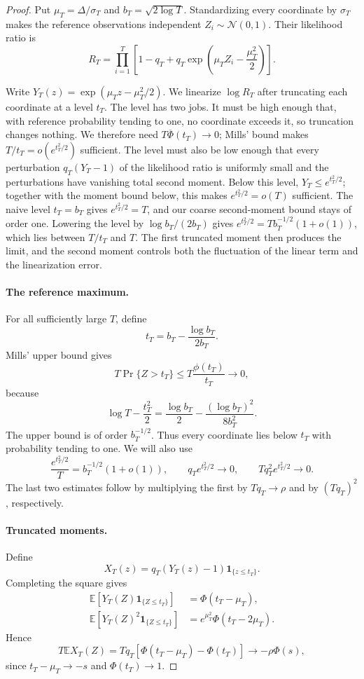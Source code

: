 \documentclass[11pt]{article}
\theoremstyle{remark}
\newcommand{\E}{\mathbb E}
\newcommand{\Normal}{\mathcal N}
\begin{document}
\begin{proof}
Put $\mu_T=\Delta/\sigma_T$ and $b_T=\sqrt{2\log T}$. Standardizing every
coordinate by $\sigma_T$ makes the reference observations independent
$Z_i\sim\Normal(0,1)$. Their likelihood ratio is
\begin{equation}\label{eq:sparse-likelihood-ratio}
 R_T=\prod_{i=1}^T
 \left[1-q_T+q_T\exp\left(\mu_TZ_i-\frac{\mu_T^2}{2}\right)\right].
\end{equation}

Write $Y_T(z)=\exp(\mu_Tz-\mu_T^2/2)$. We linearize $\log R_T$ after
truncating each coordinate at a level $t_T$.
The level has two jobs. It must be high enough that, with reference
probability tending to one, no coordinate exceeds it, so truncation changes
nothing. We therefore need $T\overline\Phi(t_T)\to0$; Mills' bound makes
$T/t_T=o(e^{t_T^2/2})$ sufficient. The level must also be low enough that every
perturbation $q_T(Y_T-1)$ of the likelihood ratio is uniformly small and the
perturbations have vanishing total second moment. Below this level,
$Y_T\leq e^{t_T^2/2}$; together with the moment bound below, this makes
$e^{t_T^2/2}=o(T)$ sufficient. The naive level $t_T=b_T$ gives
$e^{t_T^2/2}=T$, and our coarse second-moment bound stays of order one.
Lowering the level by $\log b_T/(2b_T)$ gives
$e^{t_T^2/2}=Tb_T^{-1/2}(1+o(1))$, which lies between $T/t_T$ and $T$. The first
truncated moment then produces the limit, and the second moment controls both
the fluctuation of the linear term and the linearization error.

\paragraph{The reference maximum.}
For all sufficiently large $T$, define
\[
 t_T=b_T-\frac{\log b_T}{2b_T}.
\]
Mills' upper bound gives
\[
 T\Pr\{Z>t_T\}\leq T\frac{\phi(t_T)}{t_T}\longrightarrow0,
\]
because
\[
 \log T-\frac{t_T^2}{2}
 =\frac{\log b_T}{2}-\frac{(\log b_T)^2}{8b_T^2}.
\]
The upper bound is of order $b_T^{-1/2}$. Thus every coordinate lies below
$t_T$ with probability tending to one. We will also use
\begin{equation}\label{eq:truncation-scales}
 \frac{e^{t_T^2/2}}{T}=b_T^{-1/2}(1+o(1)),\qquad
 q_Te^{t_T^2/2}\to0,\qquad Tq_T^2e^{t_T^2/2}\to0.
\end{equation}
The last two estimates follow by multiplying the first by $Tq_T\to\rho$
and by $(Tq_T)^2$, respectively.

\paragraph{Truncated moments.}
Define
\[
 X_T(z)=q_T(Y_T(z)-1)\mathbf1_{\{z\leq t_T\}}.
\]
Completing the square gives
\begin{align}
 \E[Y_T(Z)\mathbf1_{\{Z\leq t_T\}}]
 &=\Phi(t_T-\mu_T),\label{eq:tilted-first}\\
 \E[Y_T(Z)^2\mathbf1_{\{Z\leq t_T\}}]
 &=e^{\mu_T^2}\Phi(t_T-2\mu_T).\label{eq:tilted-second}
\end{align}
Hence
\[
 T\E X_T(Z)=Tq_T[\Phi(t_T-\mu_T)-\Phi(t_T)]
 \longrightarrow-\rho\Phi(s),
\]
since $t_T-\mu_T\to-s$ and $\Phi(t_T)\to1$.


\end{proof}
\end{document}
